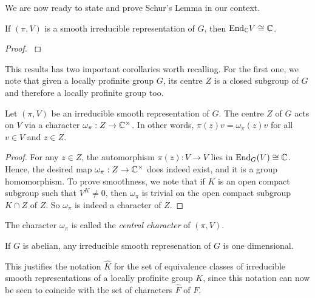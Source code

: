 We are now ready to state and prove Schur's Lemma in our context.

\begin{thm}\label{thm:schur}
    If $(\pi,V)$ is a smooth irreducible representation of $G$, then $\mathrm{End}_{\mathbb{C}}V\cong \mathbb{C}$.
\end{thm}
\begin{proof}
    \cite[Schur's Lemma 2.6]{BH1}
\end{proof}

This results has two important corollaries worth recalling. For the first one, we note that given a locally profinite group $G$, its centre $Z$ is a closed subgroup of $G$ and therefore a locally profinite group too.

\begin{cor}\label{cor:centralchar}
    Let $(\pi,V)$ be an irreducible smooth representation of $G$. The centre $Z$ of $G$ acts on $V$ via a character $\omega_{\pi}:Z\to\mathbb{C}^{\times}$. In other words, $\pi(z)v=\omega_{\pi}(z)v$ for all $v\in V$ and $z\in Z$.
\end{cor}

\begin{proof}
    For any $z\in Z$, the automorphism $\pi(z):V\to V$ lies in $\mathrm{End}_G(V)\cong\mathbb{C}$. Hence, the desired map $\omega_{\pi}:Z\to\mathbb{C}^{\times}$ does indeed exist, and it is a group homomorphism. To prove smoothness, we note that if $K$ is an open compact subgroup such that $V^K\neq 0$, then $\omega_{\pi}$ is trivial on the open compact subgroup $K\cap Z$ of $Z$. So $\omega_{\pi}$ is indeed a character of $Z$.
\end{proof}

The character $\omega_{\pi}$ is called the \textit{central character} of $(\pi,V)$.

\begin{cor}
    If $G$ is abelian, any irreducible smooth represenation of $G$ is one dimensional.
\end{cor}

This justifies the notation $\hat{K}$ for the set of equivalence classes of irreducible smooth representations of a locally profinite group $K$, since this notation can now be seen to coincide with the set of characters $\hat{F}$ of $F$.